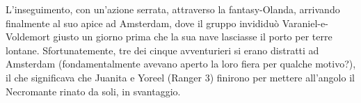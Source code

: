 L'inseguimento, con un'azione serrata, attraverso la fantasy-Olanda, arrivando finalmente al suo apice ad Amsterdam, dove il gruppo invididuò Varaniel-e-Voldemort giusto un giorno prima che la sua nave lasciasse il porto per terre lontane. Sfortunatemente, tre dei cinque avventurieri si erano distratti ad Amsterdam (fondamentalmente avevano aperto la loro fiera per qualche motivo?), il che significava che Juanita e Yoreel (Ranger 3) finirono per mettere all'angolo il Necromante rinato da soli, in svantaggio.